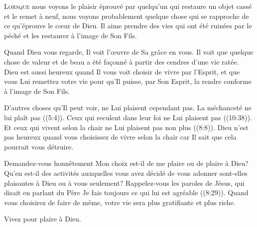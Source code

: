 


\lettrine{L}{orsque} nous voyons le plaisir éprouvé par quelqu'un
 qui restaure un objet cassé et le remet à neuf,
 nous voyons probablement quelque chose qui se rapproche de ce
 qu'éprouve le c\oe{}ur de Dieu.
 Il aime prendre des vies qui ont été ruinées par le péché
 et les restaurer à l'image de Son Fils. 

Quand Dieu vous regarde, Il voit l'\oe{}uvre de Sa grâce en vous.
 Il voit que quelque chose de valeur et de beau
 a été façonné à partir des cendres d'une vie ratée.
 Dieu est aussi heureux quand Il vous voit choisir de vivre par l'Esprit,
 et que vous Lui remettez votre vie pour qu'Il puisse, par Son Esprit,
 la rendre conforme à l'image de Son Fils. 


D'autres choses qu'Il peut voir, ne Lui plaisent cependant pas.
 La méchanceté ne lui plaît pas ((5:4)).
 Ceux qui reculent dans leur foi ne Lui plaisent pas ((10:38)).
 Et ceux qui vivent selon la chair ne Lui plaisent pas non plus
 ((8:8)).
 Dieu n'est pas heureux quand vous choisissez de vivre selon la chair
 car Il sait que cela pourrait vous détruire. 

Demandez-vous honnêtement\frcolon{}
 Mon choix est-il de me plaire ou de plaire à Dieu?
 Qu'en est-il des activités auxquelles vous avez décidé de vous adonner\frcolon{}
 sont-elles plaisantes à Dieu ou à vous seulement?
 Rappelez-vous les paroles de Jésus, qui disait en parlant du Père\frcolon{}
 \Og Je fais toujours ce qui lui est agréable \Fg{} ((8:29)).
 Quand vous choisirez de faire de même,
 votre vie sera plus gratifiante et plus riche. 

Vivez pour plaire à Dieu. 

\dvrule






